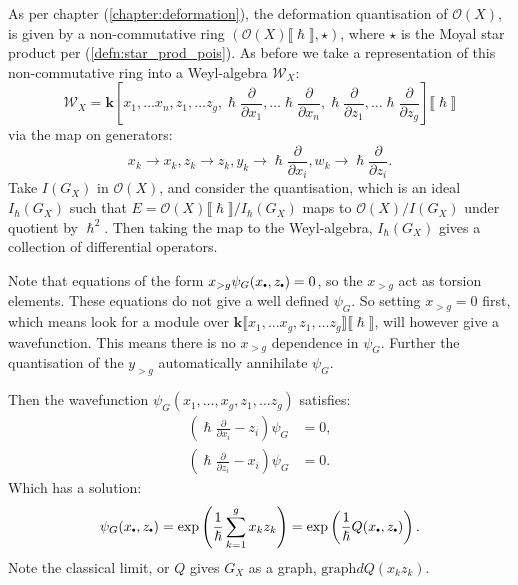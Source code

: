     As per chapter (\ref{chapter:deformation}), the deformation quantisation of \( \mathcal{O}(X)\), is given by a  non-commutative ring \(( \mathcal{O}(X)\lBrack \hslash \rBrack, \star)\), where \( \star\) is the Moyal star product per (\ref{defn:star_prod_pois}).
    As before we take a representation of this non-commutative ring into a Weyl-algebra \( \mathcal{W}_X\):
    \[ \mathcal{W}_X = \mathbf{k}[x_1, \dots x_n, z_1, \dots z_g, \hslash \frac{\partial}{\partial x_1}, \dots \hslash \frac{\partial}{\partial x_n}, \hslash \frac{\partial}{\partial z_1}, \dots \hslash \frac{\partial}{\partial z_g}] \lBrack \hslash \rBrack \]
    via the map on generators:
    \[ x_k \rightarrow x_k, z_k \rightarrow z_k, y_k \rightarrow \hslash \frac{\partial}{\partial x_i},  w_k \rightarrow \hslash \frac{\partial}{\partial z_i}.\] 
    Take \(I(G_X)\) in \(\mathcal{O}(X)\), and consider the quantisation, which is an ideal \( I_{\hslash} (G_X)\) such that \( E=\mathcal{O}(X)\lBrack \hslash \rBrack/ I_{\hslash}(G_X) \) maps to \(\mathcal{O}(X)/ I(G_X)\) under quotient by \(\hslash^2\). Then taking the map to the Weyl-algebra, \( I_{\hslash}(G_X)\) gives a collection of differential operators.
    
    Note that equations of the form \( x_{> g} \psi_G(x_{\sbt},z_{\sbt}) = 0\), so the \(x_{>g}\) act as torsion elements. These equations do not give a well defined \( \psi_G\). So setting \( x_{>g} =0\) first, which means look for a module over \( \mathbf{k} \lBrack x_1 , \dots x_g, z_1, \dots z_g\rBrack \lBrack \hslash \rBrack\), will however give a wavefunction. This means there is no \( x_{>g}\) dependence in \( \psi_G\). Further the quantisation of the \(y_{>g}\) automatically annihilate \( \psi_G\).
    
    Then the wavefunction \( \psi_G(x_1, \dots , x_g, z_1, \dots z_g)\) satisfies:
    \begin{align*}
        \left( \hslash \frac{\partial}{\partial x_i } -z_i \right)\psi_G &= 0,\\
        \left( \hslash \frac{\partial}{\partial z_i } - x_i \right)  \psi_G &= 0.
    \end{align*}
    Which has a solution:
    \begin{equation} 
    \label{eqn:psigextgdim}
    \psi_G(x_{\sbt}, z_{\sbt}) = \exp\left(\frac{1}{\hslash} \sum_{k=1}^g x_k z_k \right) = \exp\left( \frac{1}{\hslash} Q(x_{\sbt},z_{\sbt})  \right).
    \end{equation}
    Note the classical limit, or \(Q\) gives \(G_X\) as a graph, \( \mathrm{graph} d Q(x_k z_k)\).
    
